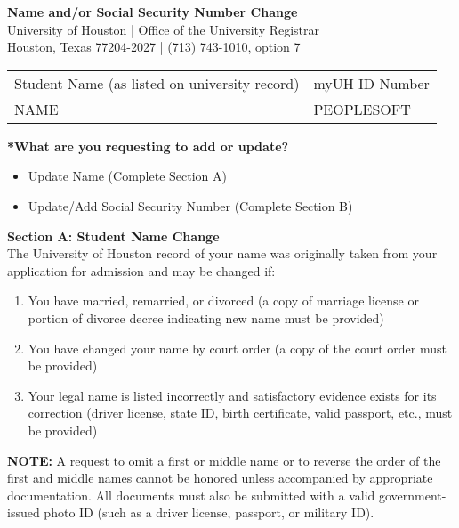 \documentclass[12pt]{article}
\newcommand{\CheckedBox}[1]{%
  \ifthenelse{\equal{#1}{yes}}{$\boxtimes$}{$\square$}%
}
\begin{document}
\begin{center}
\textbf{Name and/or Social Security Number Change}\\
University of Houston | Office of the University Registrar\\
Houston, Texas 77204-2027 | (713) 743-1010, option 7
\end{center}

\vspace{1em}
\noindent\begin{tabular}{@{}p{}p{}@{}}
Student Name (as listed on university record) & myUH ID Number\\
{{NAME}} & {{PEOPLESOFT}}\\
\end{tabular}

\vspace{1em}
\noindent\textbf{*What are you requesting to add or update?}\\
\begin{itemize}[leftmargin=0.7cm]
	\item \CheckedBox{{{EDIT_NAME}}} Update Name (Complete Section A)
	\item \CheckedBox{{{EDIT_SSN}}} Update/Add Social Security Number (Complete Section B)
\end{itemize}

\vspace{1em}
\noindent\textbf{Section A: Student Name Change}\\
The University of Houston record of your name was originally taken from your application for admission and may be changed if:
\begin{enumerate}
\item You have married, remarried, or divorced (a copy of marriage license or portion of divorce decree indicating new name must be provided)
\item You have changed your name by court order (a copy of the court order must be provided)
\item Your legal name is listed incorrectly and satisfactory evidence exists for its correction (driver license, state ID, birth certificate, valid passport, etc., must be provided)
\end{enumerate}

\noindent\textbf{NOTE:} A request to omit a first or middle name or to reverse the order of the first and middle names cannot be honored unless accompanied by appropriate documentation. All documents must also be submitted with a valid government-issued photo ID (such as a driver license, passport, or military ID).
\end{document}
